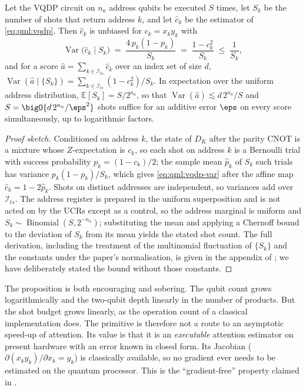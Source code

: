\begin{proposition}\label{thm:qml:vqdp-variance}
Let the VQDP circuit on $n_a$ address qubits be executed $S$ times, let $S_k$ be the number of shots that return address $k$, and let $\hat{c}_k$ be the estimator of \cref{eq:qml:vqdp}. Then $\hat{c}_k$ is unbiased for $c_k = x_k y_k$ with
\begin{equation}\label{eq:qml:vqdp-var}
\operatorname{Var}\big(\hat{c}_k \mid S_k\big) \;=\; \frac{4\,p_k(1-p_k)}{S_k} \;=\; \frac{1 - c_k^2}{S_k} \;\le\; \frac{1}{S_k},
\end{equation}
and for a score $\hat{a} = \sum_{k \in \mathcal{I}_{ts}} \hat{c}_k$ over an index set of size $d$,
$\operatorname{Var}(\hat{a} \mid \{S_k\}) = \sum_{k \in \mathcal{I}_{ts}} (1 - c_k^2)/S_k$. In expectation over the uniform address distribution, $\mathbb{E}[S_k] = S/2^{n_a}$, so that $\operatorname{Var}(\hat{a}) \lesssim d\,2^{n_a}/S$ and $S = \bigO{d\,2^{n_a}/\eps^2}$ shots suffice for an additive error $\eps$ on every score simultaneously, up to logarithmic factors.
\end{proposition}

\begin{proof}[Proof sketch]
Conditioned on address $k$, the state of $D_K$ after the parity CNOT is a mixture whose $Z$-expectation is $c_k$, so each shot on address $k$ is a Bernoulli trial with success probability $p_k = (1 - c_k)/2$; the sample mean $\hat{p}_k$ of $S_k$ such trials has variance $p_k(1-p_k)/S_k$, which gives \cref{eq:qml:vqdp-var} after the affine map $\hat{c}_k = 1 - 2\hat{p}_k$. Shots on distinct addresses are independent, so variances add over $\mathcal{I}_{ts}$. The address register is prepared in the uniform superposition and is not acted on by the UCRs except as a control, so the address marginal is uniform and $S_k \sim \operatorname{Binomial}(S, 2^{-n_a})$; substituting the mean and applying a Chernoff bound to the deviation of $S_k$ from its mean yields the stated shot count. The full derivation, including the treatment of the multinomial fluctuation of $\{S_k\}$ and the constants under the paper's normalisation, is given in the appendix of \cite{guo2025vqt}; we have deliberately stated the bound without those constants.
\end{proof}

The proposition is both encouraging and sobering. The qubit count grows logarithmically and the two-qubit depth linearly in the number of products. But the shot budget grows linearly, as the operation count of a classical implementation does. The primitive is therefore not a route to an asymptotic speed-up of attention. Its value is that it is an \emph{executable} attention estimator on present hardware with an error known in closed form. Its Jacobian ($\partial (x_k y_k)/\partial x_k = y_k$) is classically available, so no gradient ever needs to be estimated on the quantum processor. This is the ``gradient-free'' property claimed in \cite{guo2025vqt}.

